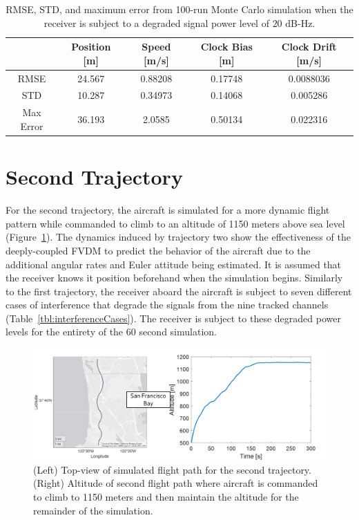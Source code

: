 \begin{table}[!ht]
    \caption{RMSE, STD, and maximum error from 100-run Monte Carlo simulation when the receiver is subject to a degraded signal power level of \(20\) dB-Hz.}\label{tbl:straight20CV}
    \centering
    \begin{tabular}{ccccc}
        \toprule
                  & Position [m] & Speed [m/s] & Clock Bias [m] & Clock Drift [m/s] \\
        \midrule
        RMSE      & 24.567       & 0.88208     & 0.17748        & 0.0088036         \\
        STD       & 10.287       & 0.34973     & 0.14068        & 0.005286          \\
        Max Error & 36.193       & 2.0585      & 0.50134        & 0.022316          \\
        \bottomrule
    \end{tabular}
\end{table}

\section{\textbf{Second Trajectory}}
For the second trajectory, the aircraft is simulated for a more dynamic flight pattern while commanded to climb to an altitude of 1150 meters above sea level (Figure~\ref{fig:trajectory2}). The dynamics induced by trajectory two show the effectiveness of the deeply-coupled FVDM to predict the behavior of the aircraft due to the additional angular rates and Euler attitude being estimated. It is assumed that the receiver knows it position beforehand when the simulation begins. Similarly to the first trajectory, the receiver aboard the aircraft is subject to seven different cases of interference that degrade the signals from the nine tracked channels (Table~\ref{tbl:interferenceCases}). The receiver is subject to these degraded power levels for the entirety of the 60 second simulation.

\begin{figure}[!ht]
    \centering
    \includegraphics[width=\linewidth]{Figures/Results/trajectory2.png}
    \caption{(Left) Top-view of simulated flight path for the second trajectory. (Right) Altitude of second flight path where aircraft is commanded to climb to 1150 meters and then maintain the altitude for the remainder of the simulation.}\label{fig:trajectory2}
\end{figure}

